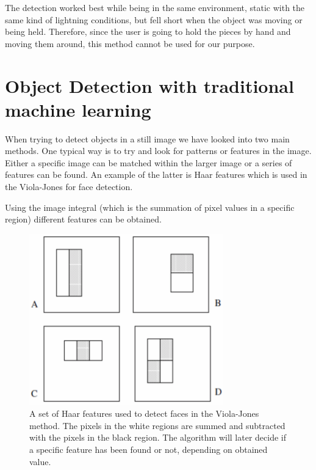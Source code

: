 The detection worked best while being in the same environment, static with the same kind of lightning conditions, but fell short when the object was moving or being held. Therefore, since the user is going to hold the pieces by hand and moving them around, this method cannot be used for our purpose.


\section{Object Detection with traditional machine learning}
\label{sec:ODtrad}

When trying to detect objects in a still image we have looked into two main methods. One typical way is to try and look for patterns or features in the image.
Either a specific image can be matched within the larger image or a series of features can be found.
An example of the latter is Haar features which is used in the Viola-Jones for face detection\cite{violaJones}.

Using the image integral (which is the summation of pixel values in a specific region) different features can be obtained.

\begin{figure}[hbtp]
\begin{center}
\includegraphics[width = 0.75\textwidth]{./Images/viola-jones.jpg} 
\caption{A set of Haar features used to detect faces in the Viola-Jones method. The pixels in the white regions are summed and subtracted with the pixels in the black region. The algorithm will later decide if a specific feature has been found or not, depending on obtained value.}
\end{center}
\end{figure}

